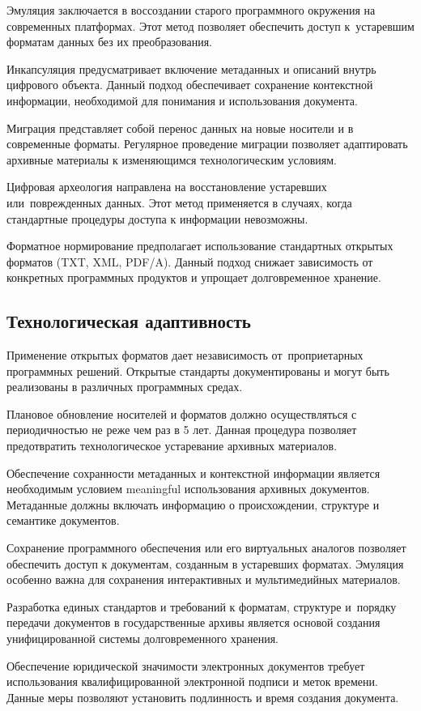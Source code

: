 \documentclass{ou}
\begin{document}
Эмуляция заключается в воссоздании старого программного окружения на современных платформах. Этот метод позволяет обеспечить доступ к~устаревшим форматам данных без их преобразования.

Инкапсуляция предусматривает включение метаданных и описаний внутрь цифрового объекта. Данный подход обеспечивает сохранение контекстной информации, необходимой для понимания и использования документа.

Миграция представляет собой перенос данных на новые носители и в современные форматы. Регулярное проведение миграции позволяет адаптировать архивные материалы к изменяющимся технологическим условиям.

Цифровая археология направлена на восстановление устаревших или~поврежденных данных. Этот метод применяется в случаях, когда стандартные процедуры доступа к информации невозможны.

Форматное нормирование предполагает использование стандартных открытых форматов (TXT, XML, PDF/A). Данный подход снижает зависимость от конкретных программных продуктов и упрощает долговременное хранение.
\subsection{Технологическая адаптивность}
Применение открытых форматов дает независимость от~проприетарных программных решений. Открытые стандарты документированы и могут быть реализованы в различных программных средах.

Плановое обновление носителей и форматов должно осуществляться с периодичностью не реже чем раз в 5 лет. Данная процедура позволяет предотвратить технологическое устаревание архивных материалов.

Обеспечение сохранности метаданных и контекстной информации является необходимым условием meaningful использования архивных документов. Метаданные должны включать информацию о происхождении, структуре и семантике документов.

Сохранение программного обеспечения или его виртуальных аналогов позволяет обеспечить доступ к документам, созданным в устаревших форматах. Эмуляция особенно важна для сохранения интерактивных и мультимедийных материалов.

Разработка единых стандартов и требований к форматам, структуре и~порядку передачи документов в государственные архивы является основой создания унифицированной системы долговременного хранения. 

Обеспечение юридической значимости электронных документов требует использования квалифицированной электронной подписи и меток времени. Данные меры позволяют установить подлинность и время создания документа.
\end{document}
